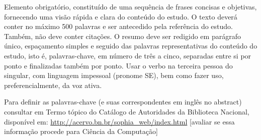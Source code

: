 
Elemento obrigatório, constituído de uma sequência de frases concisas e objetivas, fornecendo uma visão rápida e clara do conteúdo do estudo. O texto deverá conter no máximo 500 palavras e ser antecedido pela referência do estudo. Também, não deve conter citações. O resumo deve ser redigido em parágrafo único, espaçamento simples e seguido das palavras representativas do conteúdo do estudo, isto é, palavras-chave, em número de três a cinco, separadas entre si por ponto e finalizadas também por ponto. Usar o verbo na terceira pessoa do singular, com linguagem impessoal (pronome SE), bem como fazer uso, preferencialmente, da voz ativa.

Para definir as palavras-chave (e suas correspondentes em inglês no abstract) consultar em Termo tópico do Catálogo de Autoridades da Biblioteca Nacional, disponível em: \url{http://acervo.bn.br/sophia_web/index.html} [avaliar se essa informação procede para Ciência da Computação]
